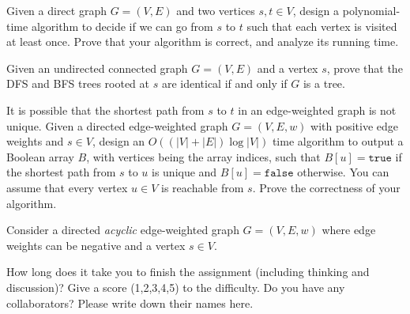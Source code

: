 \documentclass{oxmathproblems}
\begin{document}
\begin{questions}
\miquestion[25]
Given a direct graph $G=(V,E)$ and two vertices $s,t\in V$, design a polynomial-time algorithm to decide if we can go from $s$ to $t$ such that each vertex is visited at least once.
Prove that your algorithm is correct, and analyze its running time.


\miquestion[25]
Given an undirected connected graph $G=(V,E)$ and a vertex $s$, prove that the DFS and BFS trees rooted at $s$ are identical if and only if $G$ is a tree.

\miquestion[25]
It is possible that the shortest path from $s$ to $t$ in an edge-weighted graph is not unique.
Given a directed edge-weighted graph $G=(V,E,w)$ with positive edge weights and $s\in V$, design an $O((|V|+|E|)\log|V|)$ time algorithm to output a Boolean array $B$, with vertices being the array indices, such that $B[u]=\texttt{true}$ if the shortest path from $s$ to $u$ is unique and $B[u]=\texttt{false}$ otherwise.
You can assume that every vertex $u\in V$ is reachable from $s$.
Prove the correctness of your algorithm.

\miquestion[25]
Consider a directed \emph{acyclic} edge-weighted graph $G=(V,E,w)$ where edge weights can be negative and a vertex $s\in V$. 
  
\miquestion
How long does it take you to finish the assignment (including thinking and discussion)?
Give a score (1,2,3,4,5) to the difficulty.
Do you have any collaborators?
Please write down their names here.
 

\end{questions}
\end{document}
